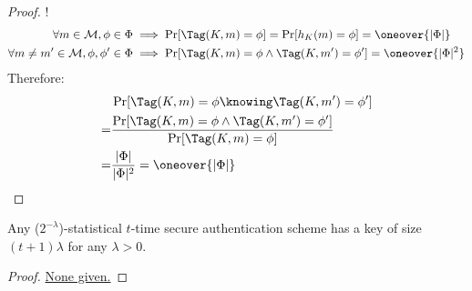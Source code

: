 \begin{proof}!
    \begin{align*}
        \forall m \in \M, \phi \in \Phi &\implies \Pr[\Tag(K, m) = \phi] = \Pr[h_K(m) = \phi] = \oneover{|\Phi|} \\
        \forall m \neq m' \in \M, \phi, \phi' \in \Phi &\implies \Pr[\Tag(K, m) = \phi \wedge \Tag(K, m') = \phi'] = \oneover{|\Phi|^2} \\
    \end{align*}
    Therefore:
    \begin{align*}
        & \Pr[\Tag(K, m) = \phi \knowing \Tag(K, m') = \phi'] \\
        =& \frac{\Pr[\Tag(K, m) = \phi \wedge \Tag(K, m') = \phi']}{\Pr[\Tag(K, m) = \phi]} \\
        =& \frac{|\Phi|}{|\Phi|^2} = \oneover{|\Phi|}
    \end{align*}
\end{proof}

\begin{theorem}
    Any ($2^{-\lambda}$)-statistical $t$-time secure authentication scheme has a key of size $(t + 1) \lambda$ for any $\lambda > 0$.
\end{theorem}

\begin{proof}
    \underline{None given.}
\end{proof}